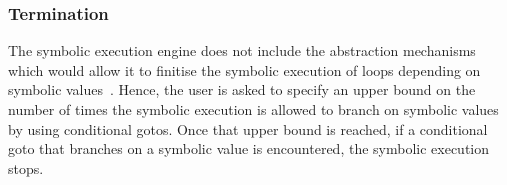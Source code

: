 \subsubsection{Termination} The \jsil symbolic execution engine does not 
include the abstraction mechanisms which would allow it to finitise the symbolic 
execution of loops depending on symbolic values~\cite{abstract:symbolic:exec}. 
Hence, the user is asked to specify an upper bound on the number of times
the symbolic execution is allowed to branch on symbolic values by using
conditional gotos. 
Once that upper bound is reached, if a conditional goto that branches 
on a symbolic value is encountered, the symbolic execution stops.  




